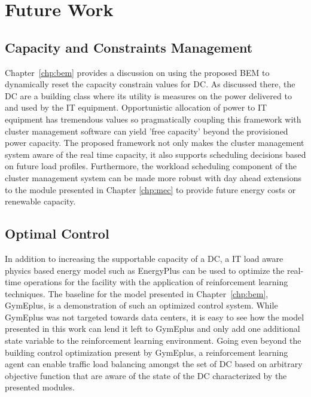 \section{Future Work}
\subsection{Capacity and Constraints Management}
Chapter~\ref{chp:bem} provides a discussion on using the proposed BEM to dynamically reset the capacity constrain values for DC. As discussed there, the DC are a building class where its utility is measures on the power delivered to and used by the IT equipment. Opportunistic allocation of power to IT equipment has tremendous values so pragmatically coupling this framework with cluster management software can yield 'free capacity' beyond the provisioned power capacity. The proposed framework not only makes the cluster management system aware of the real time capacity, it also supports scheduling decisions based on future load profiles. Furthermore, the workload scheduling component of the cluster management system can be made more robust with day ahead extensions to the module presented in Chapter \ref{chp:mec} to provide future energy costs or renewable capacity.


\subsection{Optimal Control}
In addition to increasing the supportable capacity of a DC, a IT load aware physics based energy model such as EnergyPlus can be used to optimize the real-time operations for the facility with the application of reinforcement learning techniques. The baseline for the model presented in Chapter~\ref{chp:bem}, GymEplus, is a demonstration of such an optimized control system. While GymEplus was not targeted towards data centers, it is easy to see how the model presented in this work can lend it left to GymEplus and only add one additional state variable to the reinforcement learning environment. Going even beyond the building control optimization present by GymEplus, a reinforcement learning agent can enable traffic load balancing amongst the set of DC based on arbitrary objective function that are aware of the state of the DC characterized by the presented modules. 



